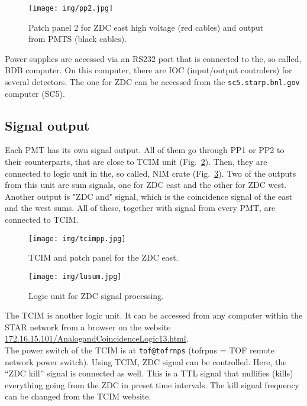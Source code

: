 \begin{figure}[htb]
\begin{center}
\texttt{[image: img/pp2.jpg]}
\end{center}
\caption{Patch panel 2 for ZDC east high voltage (red cables) and output from PMTS (black cables).}
\label{pp2}
\end{figure}

Power supplies are accessed via an RS232 port that is connected to the, so called, BDB computer. On this computer, there are IOC (input/output controlers) for several detectors. The one for ZDC can be accessed from the \texttt{sc5.starp.bnl.gov} computer (SC5).

\subsection{Signal output}

Each PMT has its own signal output. All of them go through PP1 or PP2 to their counterparts, that are close to TCIM unit (Fig.~\ref{tcimpp}). Then, they are connected to logic unit in the, so called, NIM crate (Fig.~\ref{lu_sum}). Two of the outputs from this unit are sum signals, one for ZDC east and the other for ZDC west. Another output is "ZDC and" signal, which is the coincidence signal of the east and the west sums. All of these, together with signal from every PMT, are connected to TCIM.

\begin{figure}[htb]
\begin{center}
\texttt{[image: img/tcimpp.jpg]}
\end{center}
\caption{TCIM and patch panel for the ZDC east.}
\label{tcimpp}
\end{figure}


\begin{figure}[htb]
\begin{center}
\texttt{[image: img/lusum.jpg]}
\end{center}
\caption{Logic unit for ZDC signal processing.}
\label{lu_sum}
\end{figure}

The TCIM is another logic unit.  It can be accessed from any  computer within the STAR network
from a browser on the website\\ 
\url{172.16.15.101/AnalogandCoincidenceLogic13.html}.\\
The power switch of the TCIM is at \texttt{tof@tofrnps} (tofrpns = TOF remote network power switch).
Using TCIM, ZDC signal can be controlled. Here, the ``ZDC kill'' signal is connected as well. This is a TTL signal that nullifies (kills) everything going from the ZDC in preset time intervals. The
kill signal frequency can be changed from the TCIM website.

